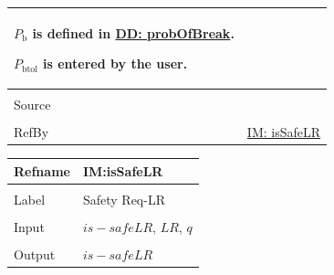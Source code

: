 \documentclass[12pt]{article}
\begin{document}
\begin{minipage}{\textwidth}
\begin{tabular}{>{\raggedright}p{}>{\raggedright\arraybackslash}p{}}
        ${P_{\text{b}}}$ is defined in \hyperref[DD:probOfBreak]{DD: probOfBreak}.
        
        ${P_{\text{b}\text{tol}}}$ is entered by the user.
        
\\ \midrule \\
Source & \cite{astm2009}
         
\\ \midrule \\
RefBy & \hyperref[IM:isSafeLR]{IM: isSafeLR}
        
\\ \bottomrule
\end{tabular}
\end{minipage}
\vspace{\baselineskip}
\noindent
\begin{minipage}{\textwidth}
\begin{tabular}{>{\raggedright}p{}>{\raggedright\arraybackslash}p{}}
\toprule \textbf{Refname} & \textbf{IM:isSafeLR}
\label{IM:isSafeLR}
\\ \midrule \\
Label & Safety Req-LR
        
\\ \midrule \\
Input & $is-safeLR$, $LR$, $q$
        
\\ \midrule \\
Output & $is-safeLR$
         

\end{tabular}
\end{minipage}
\end{document}
